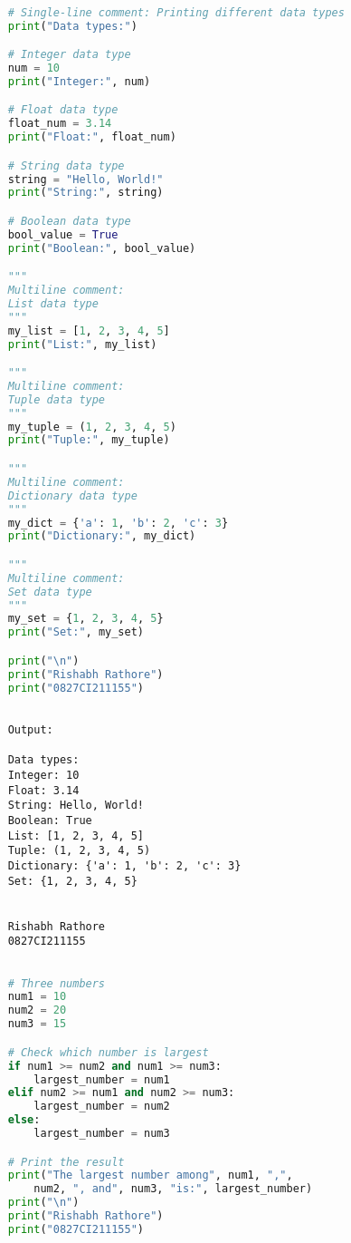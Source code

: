 \documentclass{report}
\begin{document}
\begin{lstlisting}[language=Python]

	# Single-line comment: Printing different data types
	print("Data types:")

	# Integer data type
	num = 10
	print("Integer:", num)

	# Float data type
	float_num = 3.14
	print("Float:", float_num)

	# String data type
	string = "Hello, World!"
	print("String:", string)

	# Boolean data type
	bool_value = True
	print("Boolean:", bool_value)

	"""
	Multiline comment:
	List data type
	"""
	my_list = [1, 2, 3, 4, 5]
	print("List:", my_list)

	"""
	Multiline comment:
	Tuple data type
	"""
	my_tuple = (1, 2, 3, 4, 5)
	print("Tuple:", my_tuple)

	"""
	Multiline comment:
	Dictionary data type
	"""
	my_dict = {'a': 1, 'b': 2, 'c': 3}
	print("Dictionary:", my_dict)

	"""
	Multiline comment:
	Set data type
	"""
	my_set = {1, 2, 3, 4, 5}
	print("Set:", my_set)

	print("\n")
	print("Rishabh Rathore")
	print("0827CI211155")
\end{lstlisting}

\begin{verbatim}

	Output:

	Data types:
	Integer: 10
	Float: 3.14
	String: Hello, World!
	Boolean: True
	List: [1, 2, 3, 4, 5]
	Tuple: (1, 2, 3, 4, 5)
	Dictionary: {'a': 1, 'b': 2, 'c': 3}
	Set: {1, 2, 3, 4, 5}
	
	
	Rishabh Rathore
	0827CI211155
\end{verbatim}

\bigskip


\sol{}

\begin{lstlisting}[language=Python]

	# Three numbers
	num1 = 10
	num2 = 20
	num3 = 15

	# Check which number is largest
	if num1 >= num2 and num1 >= num3:
		largest_number = num1
	elif num2 >= num1 and num2 >= num3:
		largest_number = num2
	else:
		largest_number = num3

	# Print the result
	print("The largest number among", num1, ",", 
		num2, ", and", num3, "is:", largest_number)
	print("\n")
	print("Rishabh Rathore")
	print("0827CI211155")
\end{lstlisting}
\end{document}

